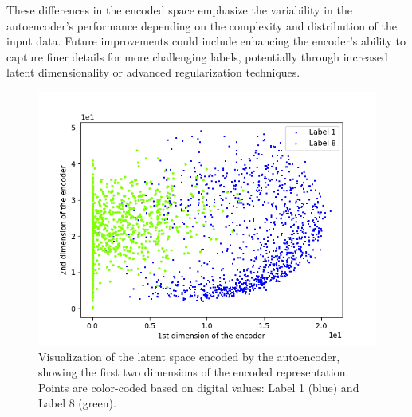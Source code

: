 \documentclass[9pt,technote]{IEEEtran}
\begin{document}
These differences in the encoded space emphasize the variability in the autoencoder's performance depending on the complexity and distribution of the input data. Future improvements could include enhancing the encoder's ability to capture finer details for more challenging labels, potentially through increased latent dimensionality or advanced regularization techniques.
\begin{figure}
	\centering
	\includegraphics[width=0.7\linewidth]{Resources/EndodedDImentions}
	\caption{Visualization of the latent space encoded by the autoencoder, showing the first two dimensions of the encoded representation. Points are color-coded based on digital values: Label 1 (blue) and Label 8 (green).}
	\label{fig:endodeddimentions}
\end{figure}

\end{document}
